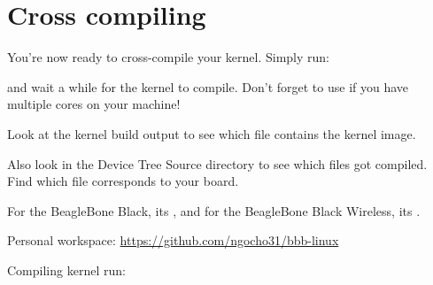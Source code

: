 \begin{itemize}

\end{itemize}



\section{Cross compiling}

You're now ready to cross-compile your kernel. Simply run:


and wait a while for the kernel to compile. Don't forget to use
 if you have multiple cores on your machine!

Look at the kernel build output to see which file contains
the kernel image.

Also look in the Device Tree Source directory to see which 
files got compiled. Find which  file corresponds to your board.

{For the BeagleBone Black, its ,
and for the BeagleBone Black Wireless, its
.}
{}

\begin{notebox}
Personal workspace: \url{https://github.com/ngocho31/bbb-linux}

Compiling kernel run: 
\end{notebox}
